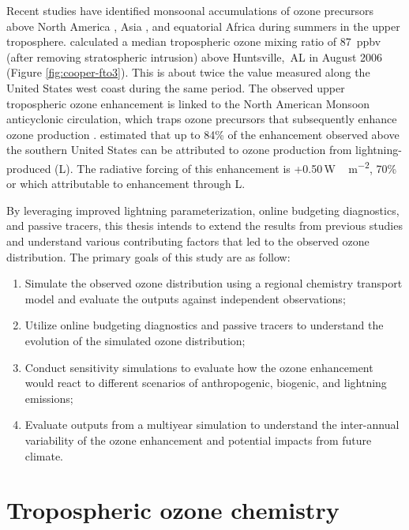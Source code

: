Recent studies have identified monsoonal accumulations of ozone precursors above North America \citep[][and references therein]{Li:2005ss,Cooper:2009nx}, Asia \citep{Park:2007bh,Worden:2009ve}, and equatorial Africa \citep{Bouarar:2011ly} during summers in the upper troposphere. \citet{Cooper:2007cr} calculated a median tropospheric ozone mixing ratio of 87~\unit{ppbv} (after removing stratospheric intrusion) above Huntsville,~AL in August 2006 (Figure \ref{fig:cooper-fto3}). This is about twice the value measured along the United States west coast during the same period. The observed upper tropospheric ozone enhancement is linked to the North American Monsoon anticyclonic circulation, which traps ozone precursors that subsequently enhance ozone production \citep{Li:2005ss}. \citet{Cooper:2006dq} estimated that up to 84\% of the enhancement observed above the southern United States can be attributed to {\insitu} ozone production from lightning-produced  (L). The radiative forcing of this enhancement is +0.50\,\unit{W\,m^{-2}}, 70\% or which attributable to enhancement through L.

By leveraging improved lightning parameterization, online budgeting diagnostics, and passive tracers, this thesis intends to extend the results from previous studies and understand various contributing factors that led to the observed ozone distribution. The primary goals of this study are as follow:
\begin{enumerate}
\item{} Simulate the observed ozone distribution using a regional chemistry transport model and evaluate the outputs against independent observations;
\item{} Utilize online budgeting diagnostics and passive tracers to understand the evolution of the simulated ozone distribution;
\item{} Conduct sensitivity simulations to evaluate how the ozone enhancement would react to different scenarios of anthropogenic, biogenic, and lightning emissions;
\item{} Evaluate outputs from a multiyear simulation to understand the inter-annual variability of the ozone enhancement and potential impacts from future climate.
\end{enumerate}

\newpage
\section{Tropospheric ozone chemistry} \label{sec:intro/ozone}

